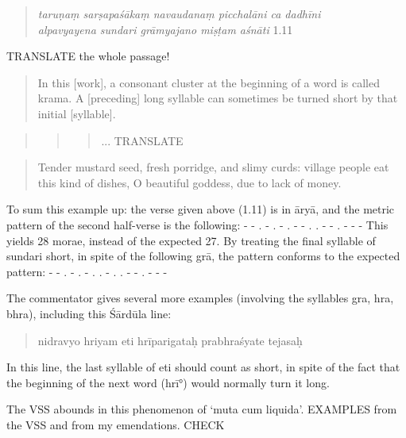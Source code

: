 \documentclass[11pt]{book}
\begin{document}
\begin{quote}
\emph{taruṇaṃ sarṣapaśākaṃ navaudanaṃ picchalāni ca dadhīni}
\textbar{}\\
\emph{alpavyayena sundari grāmyajano miṣṭam aśnāti} \textbar{}\textbar{}
1.11 \textbar{}\textbar{}
\end{quote}

TRANSLATE the whole passage!

\begin{quote}
In this {[}work{]}, a consonant cluster at the beginning of a word is
called krama. A {[}preceding{]} long syllable can sometimes be turned
short by that initial {[}syllable{]}.
\end{quote}

\begin{quote}
\begin{quote}
\begin{quote}
   ... TRANSLATE 
\end{quote}
\end{quote}
\end{quote}

\begin{quote}
Tender mustard seed, fresh porridge, and slimy curds: village people eat
this kind of dishes, O beautiful goddess, due to lack of money.
\end{quote}

To sum this example up: the verse given above (1.11) is in āryā, and the
metric pattern of the second half-verse is the following: - - . - . - .
- - . . - - . - - - This yields 28 morae, instead of the expected 27. By
treating the final syllable of sundari short, in spite of the following
grā, the pattern conforms to the expected pattern: - - . - . - . . - . .
- - . - - -

The commentator gives several more examples (involving the syllables
gra, hra, bhra), including this Śārdūla line:

\begin{quote}
nidravyo hriyam eti hrīparigataḥ prabhraśyate tejasaḥ
\end{quote}

In this line, the last syllable of eti should count as short, in spite
of the fact that the beginning of the next word (hrī°) would normally
turn it long.

The VSS abounds in this phenomenon of `muta cum liquida'. EXAMPLES from
the VSS and from my emendations. CHECK
\end{document}
